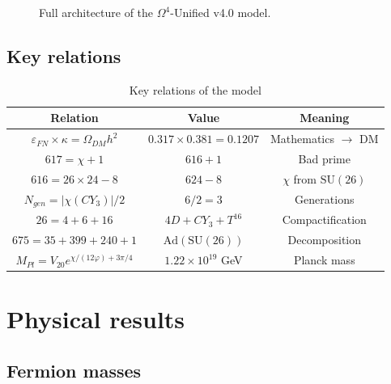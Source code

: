 \documentclass[12pt,a4paper,twoside]{article}
\newcommand{\SU}{\mathrm{SU}}
\newcommand{\Ad}{\mathrm{Ad}}
\newcommand{\EPS}{\varepsilon}
\theoremstyle{definition}
\begin{document}
\begin{figure}[H]
\caption{Full architecture of the $\Omega^4$-Unified v4.0 model.}
\label{fig:architecture}
\end{figure}

\subsection{Key relations}

\begin{table}[H]
\centering
\small
\caption{Key relations of the model}
\label{tab:key_relations}
\begin{tabular}{c|c|c}
\toprule
\textbf{Relation} & \textbf{Value} & \textbf{Meaning} \\
\midrule
$\EPS_{FN} \times \kappa = \Omega_{DM}h^2$ & $0.317 \times 0.381 = 0.1207$ & Mathematics $\to$ DM \\
$617 = \chi + 1$ & $616 + 1$ & Bad prime \\
$616 = 26 \times 24 - 8$ & $624 - 8$ & $\chi$ from $\SU(26)$ \\
$N_{gen} = |\chi(CY_3)|/2$ & $6/2 = 3$ & Generations \\
$26 = 4 + 6 + 16$ & $4D + CY_3 + T^{16}$ & Compactification \\
$675 = 35 + 399 + 240 + 1$ & $\Ad(\SU(26))$ & Decomposition \\
$M_{Pl} = V_{20} e^{\chi/(12\varphi) + 3\pi/4}$ & $1.22 \times 10^{19}$ GeV & Planck mass \\
\bottomrule
\end{tabular}
\end{table}

\section{Physical results}
\label{sec:physics}

\subsection{Fermion masses}
\end{document}
